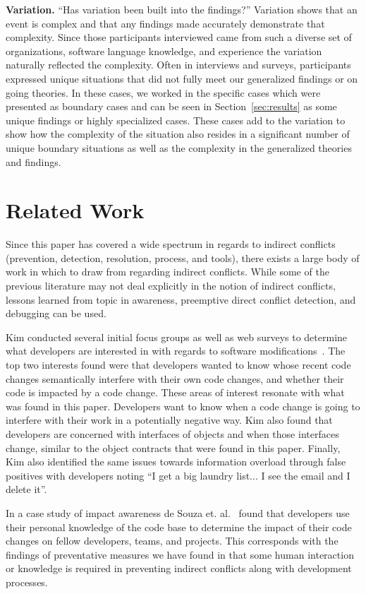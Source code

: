 \documentclass[conference]{IEEEtran}
\begin{document}
{\bfseries Variation.} ``Has variation been built into the findings?'' Variation shows that an event is complex and that any findings
made accurately demonstrate that complexity. Since those participants interviewed came from such a diverse set of organizations, 
software language knowledge, and experience the variation naturally reflected the complexity. Often in interviews and surveys, participants
expressed unique situations that did not fully meet our generalized findings or on going theories. In these cases, we worked in the specific
cases which were presented as boundary cases and can be seen in Section~\ref{sec:results} as some unique findings or highly
specialized cases. These cases add to the variation
to show how the complexity of the situation also resides in a significant number of unique boundary situations as well as the complexity
in the generalized theories and findings.

\section{Related Work}
\label{sec:related}

Since this paper has covered a wide spectrum in regards to indirect conflicts (prevention, detection, resolution, process, and tools), there
exists a large body of work in which to draw from regarding indirect conflicts. While some of the previous literature may not deal explicitly
in the notion of indirect conflicts, lessons learned from topic in awareness, preemptive direct conflict detection, and debugging can be used.

Kim conducted several initial focus groups as well as web surveys to determine what developers are interested in with regards to software
modifications~\cite{Kim:2011:ESA}. The top two interests found were that developers wanted to know whose recent code changes semantically
interfere with their own code changes, and whether their code is impacted by a code change. These areas of interest resonate with what was
found in this paper. Developers want to know when a code change is going to interfere with their work in a potentially negative way.  Kim
also found that developers are concerned with interfaces of objects and when those interfaces change, similar to the object contracts that
were found in this paper. Finally, Kim also identified the same issues towards information overload through false positives with developers
noting ``I get a big laundry list... I see the email and I delete it''.

In a case study of impact awareness de Souza et. al.~\cite{deSouza:2008:ESS} found that developers use their personal knowledge of the
code base to determine the impact of their code changes on fellow developers, teams, and projects. This corresponds with the findings of
preventative measures we have found in that some human interaction or knowledge is required in preventing indirect conflicts along with
development processes.
\end{document}
